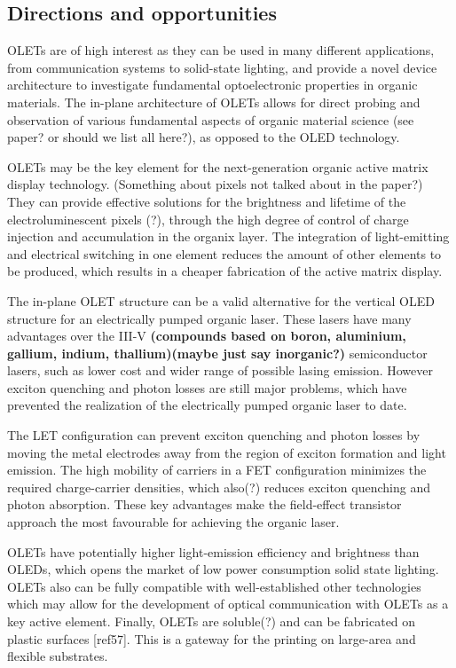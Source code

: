 \subsection{Directions and opportunities} %

OLETs are of high interest as they can be used in many different applications, from communication systems to solid-state lighting, and provide a novel device architecture to investigate fundamental optoelectronic properties in organic materials. The in-plane architecture of OLETs allows for direct probing and observation of various fundamental aspects of organic material science (see paper? or should we list all here?), as opposed to the OLED technology.

OLETs may be the key element for the next-generation organic active matrix display technology. (Something about pixels not talked about in the paper?) They can provide effective solutions for the brightness and lifetime of the electroluminescent pixels (?), through the high degree of control of charge injection and accumulation in the organix layer. The integration of light-emitting and electrical switching in one element reduces the amount of other elements to be produced, which results in a cheaper fabrication of the active matrix display.

The in-plane OLET structure can be a valid alternative for the vertical OLED structure for an electrically pumped organic laser. These lasers have many advantages over the III-V \textbf{(compounds based on boron, aluminium, gallium, indium, thallium)(maybe just say inorganic?)} semiconductor lasers, such as lower cost and wider range of possible lasing emission. However exciton quenching and photon losses are still major problems, which have prevented the realization of the electrically pumped organic laser to date.

The LET configuration can prevent exciton quenching and photon losses by moving the metal electrodes away from the region of exciton formation and light emission. The high mobility of carriers in a FET configuration minimizes the required charge-carrier densities, which also(?) reduces exciton quenching and photon absorption. These key advantages make the field-effect transistor approach the most favourable for achieving the organic laser.

OLETs have potentially higher light-emission efficiency and brightness than OLEDs, which opens the market of low power consumption solid state lighting. OLETs also can be fully compatible with well-established other technologies which may allow for the development of optical communication with OLETs as a key active element. Finally, OLETs are soluble(?) and can be fabricated on plastic surfaces [ref57]. This is a gateway for the printing on large-area and flexible substrates.